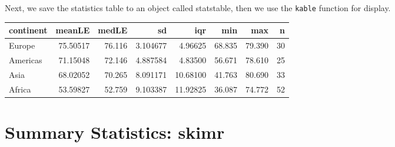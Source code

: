 \documentclass[]{book}
\newenvironment{Shaded}{\begin{snugshade}}{\end{snugshade}}
\newcommand{\KeywordTok}[1]{\textcolor[rgb]{0.13,0.29,0.53}{\textbf{#1}}}
\newcommand{\DataTypeTok}[1]{\textcolor[rgb]{0.13,0.29,0.53}{#1}}
\newcommand{\DecValTok}[1]{\textcolor[rgb]{0.00,0.00,0.81}{#1}}
\newcommand{\StringTok}[1]{\textcolor[rgb]{0.31,0.60,0.02}{#1}}
\newcommand{\CommentTok}[1]{\textcolor[rgb]{0.56,0.35,0.01}{\textit{#1}}}
\newcommand{\OtherTok}[1]{\textcolor[rgb]{0.56,0.35,0.01}{#1}}
\newcommand{\OperatorTok}[1]{\textcolor[rgb]{0.81,0.36,0.00}{\textbf{#1}}}
\newcommand{\NormalTok}[1]{#1}
\begin{document}
Next, we save the statistics table to an object called statstable, then
we use the \texttt{kable} function for display.

\begin{Shaded}
\end{Shaded}

\begin{tabular}{l|r|r|r|r|r|r|r}
\hline
continent & meanLE & medLE & sd & iqr & min & max & n\\
\hline
Europe & 75.50517 & 76.116 & 3.104677 & 4.96625 & 68.835 & 79.390 & 30\\
\hline
Americas & 71.15048 & 72.146 & 4.887584 & 4.83500 & 56.671 & 78.610 & 25\\
\hline
Asia & 68.02052 & 70.265 & 8.091171 & 10.68100 & 41.763 & 80.690 & 33\\
\hline
Africa & 53.59827 & 52.759 & 9.103387 & 11.92825 & 36.087 & 74.772 & 52\\
\hline
\end{tabular}

\section{Summary Statistics: skimr}\label{summary-statistics-skimr}
\end{document}
